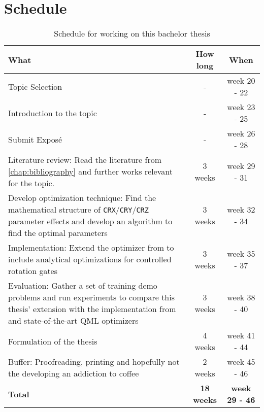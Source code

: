 \chapter{Schedule}
\label{chap:sched}

\begin{table}[h] %
    \centering
    \begin{tabularx}{0.95\textwidth}{X | c | c}
        \textbf{What} & \textbf{How long} & \textbf{When} \\
        \hline
        Topic Selection
            & -
            & week 20 - 22 \\
        \rule{0pt}{3ex
        }Introduction to the topic
            & -
            & week 23 - 25 \\
        \rule{0pt}{3ex
        }Submit Exposé
            & -
            & week 26 - 28 \\
        \hline
        Literature review: Read the literature from \autoref{chap:bibliography}
            and further works relevant for the topic. 
            & 3 weeks
            & week 29 - 31 \\
        \rule{0pt}{3ex
        }Develop optimization technique:
            Find the mathematical structure of
            \texttt{CRX}/\texttt{CRY}/\texttt{CRZ} parameter effects and develop
            an algorithm to find the optimal parameters
            & 3 weeks
            & week 32 - 34 \\
        \rule{0pt}{3ex
        }Implementation:
            Extend the optimizer from \cite{wendenius_gradient-free_2023} to
            include analytical optimizations for controlled rotation gates
            & 3 weeks
            & week 35 - 37 \\
        \rule{0pt}{3ex
        }Evaluation:
            Gather a set of training demo problems and run experiments to
            compare this thesis' extension with the implementation from
            \cite{wendenius_gradient-free_2023} and state-of-the-art QML
            optimizers
            & 3 weeks
            & week 38 - 40 \\
        \rule{0pt}{3ex
        }Formulation of the thesis
            & 4 weeks
            & week 41 - 44 \\
        \rule{0pt}{3ex
        }Buffer:
            Proofreading, printing and hopefully not the developing an addiction
            to coffee
            & 2 weeks
            & week 45 - 46 \\
        \hline
        \textbf{Total} & \textbf{18 weeks} & \textbf{week 29 - 46}
    \end{tabularx}
    \caption{Schedule for working on this bachelor thesis}
    \label{tab:schedule}
\end{table}
